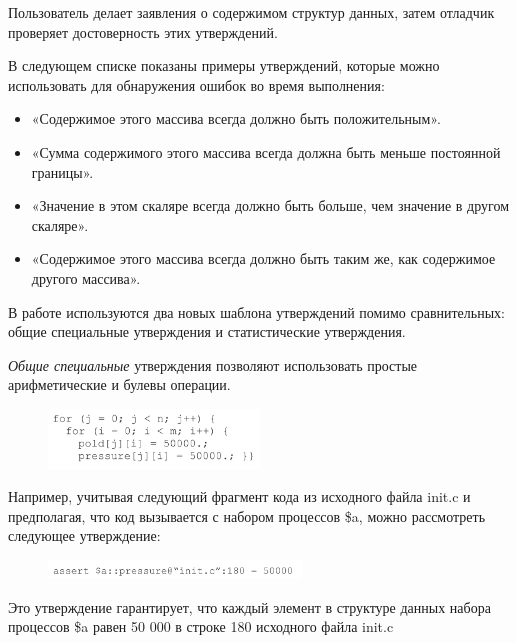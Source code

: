 Пользователь делает заявления о содержимом структур данных, затем отладчик проверяет достоверность этих утверждений.

В следующем списке показаны примеры утверждений, которые можно использовать для обнаружения ошибок во время выполнения:

\begin{itemize}
	\item «Содержимое этого массива всегда должно быть положительным».
	\item «Сумма содержимого этого массива всегда должна быть меньше постоянной границы».
	\item «Значение в этом скаляре всегда должно быть больше, чем значение в другом скаляре».
	\item «Содержимое этого массива всегда должно быть таким же, как содержимое другого массива». 
\end{itemize}

В работе используются два новых шаблона утверждений помимо сравнительных: общие специальные утверждения и статистические утверждения.
\newline

\textit{Общие специальные} утверждения позволяют использовать простые арифметические и булевы операции.

\begin{figure}[h]
	\includegraphics[width=0.5\textwidth]{ResearchNotes/rndhpc_not_edt_2021_11_10/krekhtunova/data_prog.png}
\end{figure}

Например, учитывая следующий фрагмент кода из исходного файла init.c и предполагая, что код вызывается с набором процессов \$a, можно рассмотреть следующее утверждение:

\begin{figure}[h]
	\includegraphics[width=0.6\textwidth]{ResearchNotes/rndhpc_not_edt_2021_11_10/krekhtunova/assert1.png}
\end{figure}

Это утверждение гарантирует, что каждый элемент в структуре данных набора процессов \$a равен 50 000 в строке 180 исходного файла init.c
\newline


